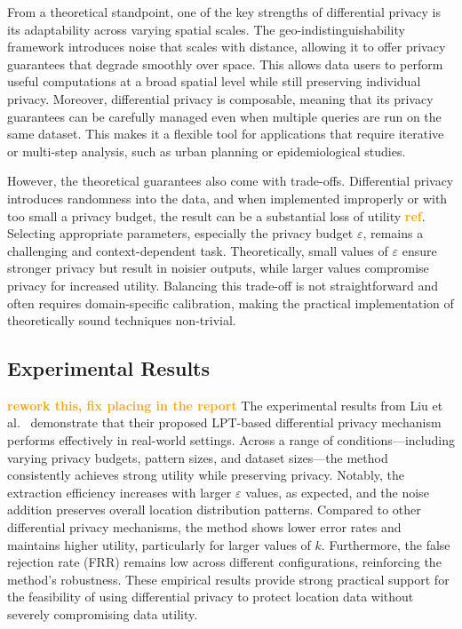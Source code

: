 \documentclass[twocolumn]{article}
\newcommand{\later}[1]{\textbf{\textcolor{orange}{#1}}}
\begin{document}
From a theoretical standpoint, one of the key strengths of differential privacy is its adaptability across varying spatial scales. The geo-indistinguishability framework introduces noise that scales with distance, allowing it to offer privacy guarantees that degrade smoothly over space. This allows data users to perform useful computations at a broad spatial level while still preserving individual privacy. Moreover, differential privacy is composable, meaning that its privacy guarantees can be carefully managed even when multiple queries are run on the same dataset. This makes it a flexible tool for applications that require iterative or multi-step analysis, such as urban planning or epidemiological studies.

However, the theoretical guarantees also come with trade-offs. Differential privacy introduces randomness into the data, and when implemented improperly or with too small a privacy budget, the result can be a substantial loss of utility \later{ref}. Selecting appropriate parameters, especially the privacy budget $\varepsilon$, remains a challenging and context-dependent task. Theoretically, small values of $\varepsilon$ ensure stronger privacy but result in noisier outputs, while larger values compromise privacy for increased utility. Balancing this trade-off is not straightforward and often requires domain-specific calibration, making the practical implementation of theoretically sound techniques non-trivial.

\subsection{Experimental Results} 

\later{rework this, fix placing in the report}
The experimental results from Liu et al.~\cite{liu2018} demonstrate that their proposed LPT-based differential privacy mechanism performs effectively in real-world settings. Across a range of conditions—including varying privacy budgets, pattern sizes, and dataset sizes—the method consistently achieves strong utility while preserving privacy. Notably, the extraction efficiency increases with larger $\varepsilon$ values, as expected, and the noise addition preserves overall location distribution patterns. Compared to other differential privacy mechanisms, the method shows lower error rates and maintains higher utility, particularly for larger values of $k$. Furthermore, the false rejection rate (FRR) remains low across different configurations, reinforcing the method's robustness. These empirical results provide strong practical support for the feasibility of using differential privacy to protect location data without severely compromising data utility.
\end{document}
